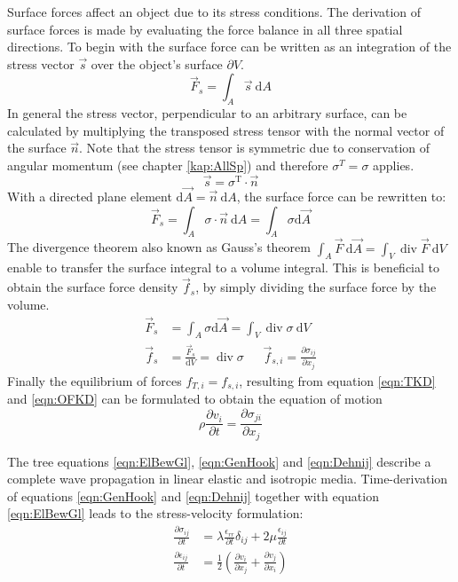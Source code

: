 \documentclass[pdftex,a4paper,parskip,listof=totoc,bibliography=totoc,onehalfspacing,12pt]{scrreprt}
\begin{document}
Surface forces affect an object due to its stress conditions. The derivation of surface forces is made by evaluating the force balance in all three spatial directions.
To begin with the surface force can be written as an integration of the stress vector $\vec{s}$ over the object's surface $\partial V$.
\begin{equation}
	\vec{F}_s = \int_A \vec{s} ~\mathrm{d}A
\end{equation}
In general the stress vector, perpendicular to an arbitrary surface, can be calculated by multiplying the transposed stress tensor with the normal vector of the surface $\vec{n}$. Note that the stress tensor is symmetric due to conservation of angular momentum (see chapter \ref{kap:AllSp}) and therefore $\sigma^T = \sigma$ applies.
\begin{equation}
	\vec{s} = \sigma^\mathrm{T} \cdot\vec{n}
\end{equation}
With a directed plane element $\mathrm{d}\vec{A} = \vec{n} ~\mathrm{d}A$, the surface force can be rewritten to: 
\begin{equation}
	\vec{F}_s = \int_A \sigma \cdot\vec{n} ~\mathrm{d}A = \int_A \sigma \mathrm{d}\vec{A} 
\end{equation}
The divergence theorem also known as Gauss's theorem $\int_A \vec{F}~\mathrm{d}\vec{A} = \int_V \operatorname{div} \vec{F} ~\mathrm{d}V$ enable to transfer the surface integral to a volume integral. This is beneficial to obtain the surface force density $\vec{f}_{s}$, by simply dividing the surface force by the volume. 
\begin{align}
	\vec{F}_s &= \int_A \sigma \mathrm{d}\vec{A} = \int_V \operatorname{div} \sigma ~\mathrm{d}V\\
	\vec{f}_s &= \frac{\vec{F}_s}{\mathrm{d}V} = \operatorname{div} \sigma~~~~~~~\vec{f}_{s,i} = \frac{\partial \sigma_{ij}}{\partial x_j}\label{eqn:OFKD}
\end{align}
Finally the equilibrium of forces $f_{T,i} = f_{s,i}$, resulting from equation \ref{eqn:TKD} and \ref{eqn:OFKD} can be formulated to obtain the equation of motion 
\begin{equation}
	\rho \frac{\partial v_i}{\partial t} =  \frac{\partial \sigma_{ji}}{\partial x_j}\label{eqn:ElBewGl}
\end{equation}

The tree equations \ref{eqn:ElBewGl}, \ref{eqn:GenHook} and \ref{eqn:Dehnij} describe a complete wave propagation in linear elastic and isotropic media.
Time-derivation of equations \ref{eqn:GenHook} and \ref{eqn:Dehnij} together with equation \ref{eqn:ElBewGl} leads to the stress-velocity formulation:
\begin{align}
	\frac{\partial\sigma_{ij}}{\partial t} &= \lambda \frac{\epsilon_{rr}}{\partial t} \delta_{ij} + 2 \mu \frac{\epsilon_{ij}}{\partial t}\label{eqn:GenHookdt}\\
	\frac{\partial\epsilon_{ij}}{\partial t} &= \frac{1}{2} \left( \frac{\partial v_i}{\partial x_j} + \frac{\partial v_j}{\partial x_i} \right)\label{eqn:Dehnijdt}
\end{align}
\cleardoublepage
\end{document}
